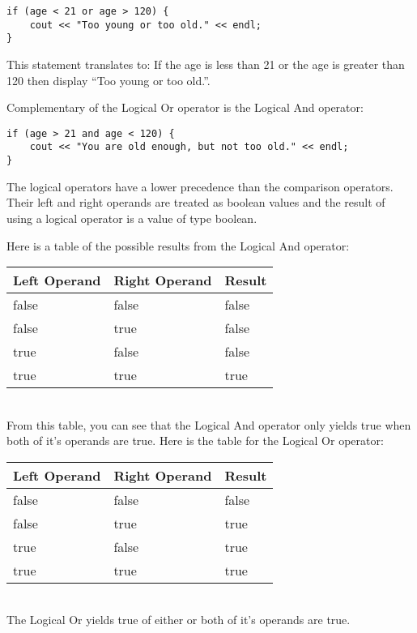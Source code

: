 \documentclass[a4paper,12pt]{article}
\begin{document}
\begin{lstlisting}
if (age < 21 or age > 120) {
	cout << "Too young or too old." << endl;
}
\end{lstlisting}

This statement translates to: If the age is less than 21 or the age is greater than 120 then display ``Too young or too old.''.

Complementary of the Logical Or operator is the Logical And operator:

\begin{lstlisting}
if (age > 21 and age < 120) {
	cout << "You are old enough, but not too old." << endl;
}
\end{lstlisting}

The logical operators have a lower precedence than the comparison operators. Their left and right operands are treated as boolean values and the result of using a logical operator is a value of type boolean. 

Here is a table of the possible results from the Logical And operator: \\

\begin{tabular}{|l|l|l|}
\hline
Left Operand & Right Operand & Result \\
\hline
false & false & false \\
\hline
false & true & false \\
\hline
true & false & false \\
\hline
true & true & true \\
\hline
\end{tabular} \\

From this table, you can see that the Logical And operator only yields true when both of it's operands are true. Here is the table for the Logical Or operator: \\

\begin{tabular}{|l|l|l|}
\hline
Left Operand & Right Operand & Result \\
\hline
false & false & false \\
\hline
false & true & true \\
\hline
true & false & true \\
\hline
true & true & true \\
\hline
\end{tabular} \\

The Logical Or yields true of either or both of it's operands are true.
\end{document}
